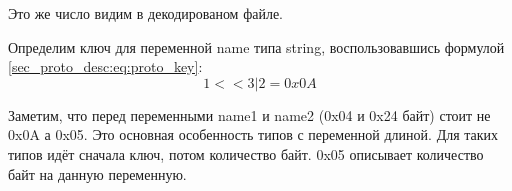 Это же число видим в декодированом файле.

Определим ключ для переменной name типа string, воспользовавшись формулой \ref{sec_proto_desc:eq:proto_key}: 
\begin{equation*}
    1 << 3 | 2 = 0x0A
\end{equation*}

Заметим, что перед переменными name1 и name2 (0x04 и 0x24 байт) стоит не 0x0A а 0x05. Это основная особенность типов с переменной длиной. Для таких типов идёт сначала ключ, потом количество байт. 0x05 описывает количество байт на данную переменную. 



